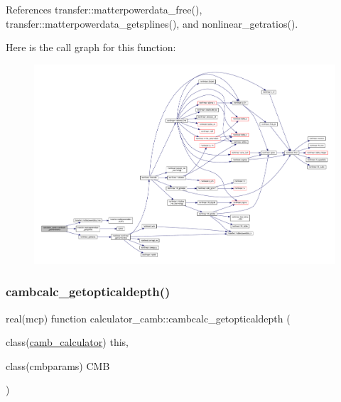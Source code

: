 References transfer\+::matterpowerdata\+\_\+free(), transfer\+::matterpowerdata\+\_\+getsplines(), and nonlinear\+\_\+getratios().

Here is the call graph for this function\+:
\nopagebreak
\begin{figure}[H]
\begin{center}
\leavevmode
\includegraphics[width=350pt]{namespacecalculator__camb_ac0ce3e4748dd96f033235b9dbf3a71b3_cgraph}
\end{center}
\end{figure}
\mbox{\label{namespacecalculator__camb_ac09824dcbd350dcc819683a630b6e646}} 
\subsubsection{\texorpdfstring{cambcalc\+\_\+getopticaldepth()}{cambcalc\_getopticaldepth()}}
{\footnotesize\ttfamily real(mcp) function calculator\+\_\+camb\+::cambcalc\+\_\+getopticaldepth (\begin{DoxyParamCaption}\item[{class(\mbox{\hyperlink{structcalculator__camb_1_1camb__calculator}{camb\+\_\+calculator}})}]{this,  }\item[{class(cmbparams)}]{C\+MB }\end{DoxyParamCaption})\hspace{0.3cm}{\ttfamily [private]}}

\mbox{\label{namespacecalculator__camb_a46bd33ed008e289fb5cb08f6feb86419}} 
